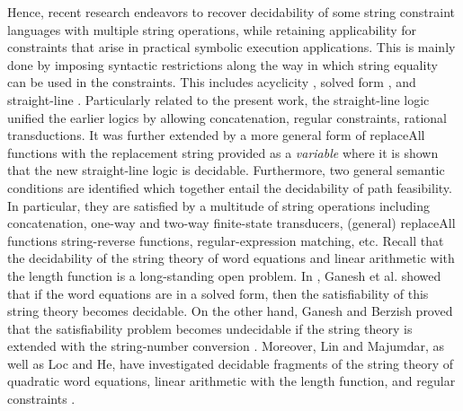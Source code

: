 {Hence,  recent research endeavors %
to recover decidability of some string constraint languages with multiple string operations, while retaining applicability for constraints that
arise in practical symbolic execution applications. This is mainly done by imposing syntactic restrictions along the way in which string equality can be used in the constraints. This includes acyclicity \cite{Abdulla14,BFL13}, solved form \cite{Vijay-length}, and straight-line \cite{LB16,HJLRV18,CCH+18}.
Particularly related to the present work, the straight-line logic \cite{LB16}  unified the earlier logics by allowing concatenation, regular constraints, rational
transductions. %
It was further extended %
by a more general form of replaceAll functions with the replacement string provided as a
\emph{variable} \cite{CCH+18} where it is shown that the new straight-line logic %
is decidable.  Furthermore, two general semantic conditions are identified  \cite{CHL+19}  which together entail the decidability of path
feasibility. In particular, they are satisfied by a multitude of string operations
including concatenation, one-way and two-way finite-state transducers, (general) replaceAll functions
string-reverse functions, regular-expression matching, etc. 
}
%
Recall that the decidability of the string theory of word equations and linear arithmetic with the length function is a long-standing open problem. In \cite{Vijay-length}, Ganesh et al. showed that if the word equations are in a solved form, then the satisfiability of this string theory becomes decidable. On the other hand, Ganesh and Berzish proved that the satisfiability problem becomes undecidable if the string theory is extended with the string-number conversion \cite{GB16}. Moreover, Lin and Majumdar, as well as Loc and He, have investigated decidable fragments of the string theory of quadratic word equations, linear arithmetic with the length function, and regular constraints \cite{LinM18,LeH18}.

